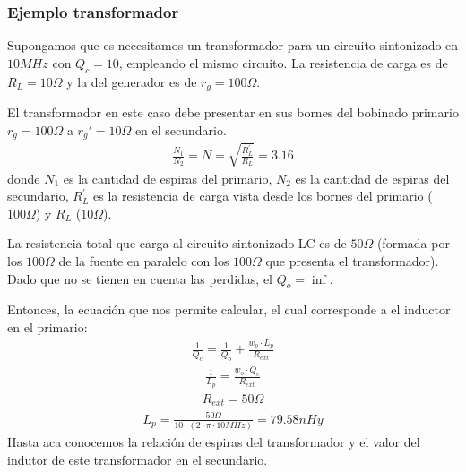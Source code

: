 \documentclass[letterpaper,11pt,spanish]{sphinxmanual}
\let\sphinxpxdimen\pdfpxdimen\else\newdimen\sphinxpxdimen
\begin{document}
\subsubsection{Ejemplo transformador}
\label{\detokenize{adaptacion/adaptacion:Ejemplo-transformador}}
\sphinxincludegraphics[width=482\sphinxpxdimen,height=166\sphinxpxdimen]{{trafo}.png}

Supongamos que es necesitamos un transformador para un circuito sintonizado en \(10 MHz\) con \(Q_c = 10\), empleando el mismo circuito. La resistencia de carga es de \(R_L = 10 \Omega\) y la del generador es de \(r_g =100 \Omega\).

El transformador en este caso debe presentar en sus bornes del bobinado primario \(r_g = 100 \Omega\) a \(r_g' =10 \Omega\) en el secundario.
\begin{equation*}
\begin{split}\frac{N_1}{N_2} = N = \sqrt{\frac{R_L^{'}}{R_L}} = 3.16\end{split}
\end{equation*}
donde \(N_1\) es la cantidad de espiras del primario, \(N_2\) es la cantidad de espiras del secundario, \(R_L^{'}\) es la resistencia de carga vista desde los bornes del primario (\(100 \Omega\)) y \(R_L\) (\(10 \Omega\)).

La resistencia total que carga al circuito sintonizado LC es de \(50 \Omega\) (formada por los \(100 \Omega\) de la fuente en paralelo con los \(100 \Omega\) que presenta el transformador). Dado que no se tienen en cuenta las perdidas, el \(Q_o = \inf\).

Entonces, la ecuación que nos permite calcular, el cual corresponde a el inductor en el primario:
\begin{equation*}
\begin{split}\frac{1}{Q_c} = \frac{1}{Q_o} + \frac{w_o \cdot L_p}{R_{ext}}\end{split}
\end{equation*}\begin{equation*}
\begin{split}\frac{1}{L_p} =   \frac{w_o \cdot Q_c}{R_{ext}}\end{split}
\end{equation*}\begin{equation*}
\begin{split}R_{ext} = 50 \Omega\end{split}
\end{equation*}\begin{equation*}
\begin{split}L_p =  \frac{50 \Omega}{ 10 \cdot (2 \cdot \pi \cdot 10 MHz)} = 79.58 nHy\end{split}
\end{equation*}
Hasta aca conocemos la relación de espiras del transformador y el valor del indutor de este transformador en el secundario.
\end{document}
